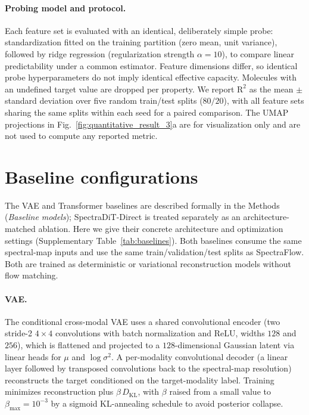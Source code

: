 \documentclass[pdflatex,sn-mathphys-num]{sn-jnl}%
\newcommand{\mname}{SpectraFlow}
\theoremstyle{thmstyleone}%
\theoremstyle{thmstyletwo}%
\theoremstyle{thmstylethree}%
\begin{document}
\begin{appendices}
\paragraph{Probing model and protocol.} Each feature set is evaluated with an identical, deliberately simple probe: standardization fitted on the training partition (zero mean, unit variance), followed by ridge regression (regularization strength $\alpha=10$), to compare linear predictability under a common estimator. Feature dimensions differ, so identical probe hyperparameters do not imply identical effective capacity. Molecules with an undefined target value are dropped per property. We report $\text{R}^2$ as the mean $\pm$ standard deviation over five random train/test splits ($80/20$), with all feature sets sharing the same splits within each seed for a paired comparison. The UMAP projections in Fig.~\ref{fig:quantitative_result_3}a are for visualization only and are not used to compute any reported metric.

\section{Baseline configurations}\label{app:baselines}
The VAE and Transformer baselines are described formally in the Methods (\emph{Baseline models}); SpectraDiT-Direct is treated separately as an architecture-matched ablation. Here we give their concrete architecture and optimization settings (Supplementary Table~\ref{tab:baselines}). Both baselines consume the same spectral-map inputs and use the same train/validation/test splits as \mname. Both are trained as deterministic or variational reconstruction models without flow matching.

\paragraph{VAE.} The conditional cross-modal VAE uses a shared convolutional encoder (two stride-2 $4\times4$ convolutions with batch normalization and ReLU, widths $128$ and $256$), which is flattened and projected to a $128$-dimensional Gaussian latent via linear heads for $\mu$ and $\log\sigma^2$. A per-modality convolutional decoder (a linear layer followed by transposed convolutions back to the spectral-map resolution) reconstructs the target conditioned on the target-modality label. Training minimizes reconstruction plus $\beta\,D_{\mathrm{KL}}$, with $\beta$ raised from a small value to $\beta_{\max}=10^{-3}$ by a sigmoid KL-annealing schedule to avoid posterior collapse.


\end{appendices}
\end{document}
